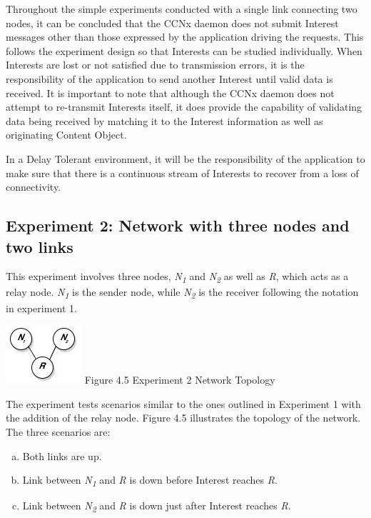 \documentclass[a4paper,12pt]{report}      %
\begin{document}
Throughout the simple experiments conducted with a single link connecting two nodes, it can be
concluded that the CCNx daemon does not submit Interest messages other than those expressed by the
application driving the requests. This follows the experiment design so that Interests can be studied individually. 
When Interests are lost or not satisfied due to transmission errors, it is
the responsibility of the application to send another Interest until valid data is received. It is
important to note that although the CCNx daemon does not attempt to re-transmit Interests itself, it does
provide the capability of validating data being received by matching it to the Interest information as
well as originating Content Object.

In a Delay Tolerant environment, it will be the responsibility of the application to make sure that there
is a continuous stream of Interests to recover from a loss of connectivity.

\subsection{Experiment 2: Network with three nodes and two links}

This experiment involves three nodes, \emph{N\textsubscript{1}} and \emph{N\textsubscript{2}} as well as \emph{R}, which acts as a relay node. \emph{N\textsubscript{1}} is the sender node, while \emph{N\textsubscript{2}} is the receiver following the notation in experiment 1.

\begin{center}
\includegraphics[scale=0.75]{exp2topo.jpg}\newline
Figure 4.5 Experiment 2 Network Topology 
\end{center}

\noindent The experiment tests scenarios similar to the ones outlined in Experiment 1 with the addition of the relay node. Figure 4.5 illustrates the topology of the network. The three scenarios are:
\begin{enumerate}[(a)]
\item Both links are up.
\item Link between \emph{N\textsubscript{1}} and \emph{R} is down before Interest reaches \emph{R}.
\item Link between \emph{N\textsubscript{2}} and \emph{R} is down just after Interest reaches \emph{R}.
\end{enumerate}
\end{document}
